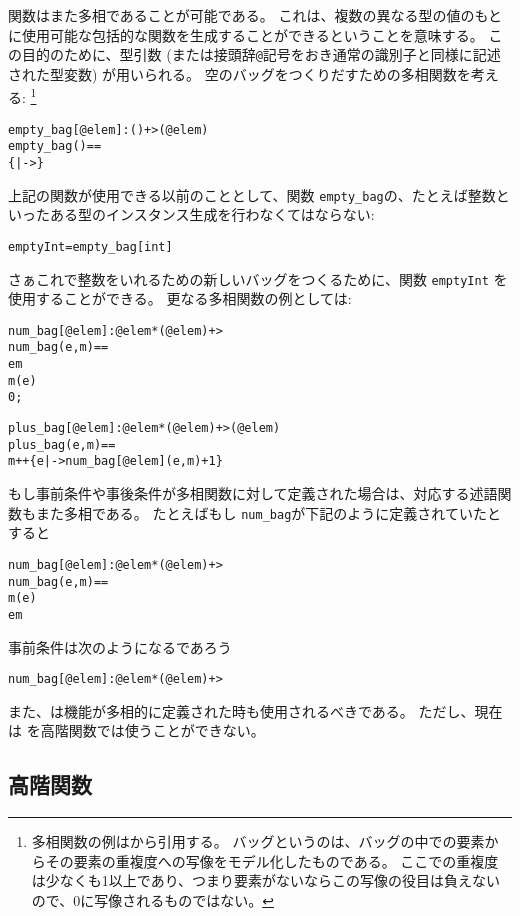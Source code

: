 \documentclass[\pformat,12pt]{jarticle}
\begin{document}
関数はまた多相であることが可能である。
これは、複数の異なる型の値のもとに使用可能な包括的な関数を生成することができるということを意味する。
この目的のために、型引数 (または接頭辞{\tt @}記号をおき通常の識別子と同様に記述された型変数) が用いられる。
空のバッグをつくりだすための多相関数を考える:
\footnote{多相関数の例は\cite{Dawes91}から引用する。
バッグというのは、バッグの中での要素からその要素の重複度への写像をモデル化したものである。 
ここでの重複度は少なくも1以上であり、つまり要素がないならこの写像の役目は負えないので、0に写像されるものではない。}
\begin{alltt}
  empty_bag[@elem] : () +> ( @elem )
  empty_bag() ==
    \{ |-> \}
\end{alltt}
上記の関数が使用できる以前のこととして、関数 {\tt empty\_bag}の、たとえば整数といったある型のインスタンス生成を行わなくてはならない:
\begin{alltt}
  emptyInt = empty_bag[int]
\end{alltt}
さぁこれで整数をいれるための新しいバッグをつくるために、関数 {\tt emptyInt} を使用することができる。
更なる多相関数の例としては:
\begin{alltt}
  num_bag[@elem] : @elem * ( @elem ) +> 
  num_bag(e, m) ==
     e  m
     m(e)
     0;

  plus_bag[@elem] : @elem * ( @elem ) +> ( @elem )
  plus_bag(e, m) ==
    m ++ \{ e |-> num_bag[@elem](e, m) + 1 \}
\end{alltt} 
もし事前条件や事後条件が多相関数に対して定義された場合は、対応する述語関数もまた多相である。
たとえばもし \texttt{num\_bag}が下記のように定義されていたとすると
\begin{alltt}
  num_bag[@elem] : @elem * ( @elem ) +> 
  num_bag(e, m) ==
    m(e)
   e  m
\end{alltt}
事前条件は次のようになるであろう
\begin{alltt}
  num_bag[@elem] :@elem * ( @elem ) +> 
\end{alltt}


また、は機能が多相的に定義された時も使用されるべきである。
ただし、現在は  を高階関数では使うことができない。

\subsection{高階関数}
\end{document}
